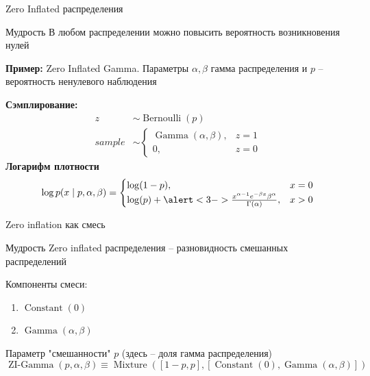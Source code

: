 \documentclass{beamer}
\begin{document}
\begin{frame}{Zero Inflated распределения}
    \begin{block}{Мудрость}
        В любом распределении можно повысить вероятность возникновения нулей
    \end{block}
    \textbf{Пример:} Zero Inflated Gamma. Параметры $\alpha, \beta$ гамма распределения и $p$ -- вероятность ненулевого наблюдения
    
    \textbf{Сэмплирование:}
    \begin{align*}
        z &\sim \operatorname{Bernoulli}(p)\\
        sample &\sim \begin{cases}
        \operatorname{Gamma}(\alpha, \beta), &z = 1\\
        0, &z = 0
        \end{cases}
    \end{align*}
    \pause
    \textbf{Логарифм плотности}
    \begin{equation*}
        \log p(x\cond p, \alpha, \beta) = \begin{cases}
        \log(1-p), &x=0\\
        \log(p) + \alert<3->{\frac {x^{\alpha -1}e^{-\beta x}\beta ^{\alpha }}{\Gamma (\alpha )}},
        &x > 0
        \end{cases}
    \end{equation*}
\end{frame}
\begin{frame}{Zero inflation как смесь}
    \begin{block}{Мудрость}
        Zero inflated распределения -- разновидность смешанных распределений
    \end{block}
    Компоненты смеси:
    \begin{enumerate}
        \item $\operatorname{Constant}(0)$
        \item $\operatorname{Gamma}(\alpha, \beta)$
    \end{enumerate}
    Параметр "смешанности" $p$ (здесь -- доля гамма распределения)
    \begin{equation*}
        \operatorname{ZI-Gamma}(p, \alpha, \beta) \equiv \operatorname{Mixture}([1-p, p], [\operatorname{Constant}(0), \operatorname{Gamma}(\alpha, \beta)])
    \end{equation*}
\end{frame}
\end{document}
